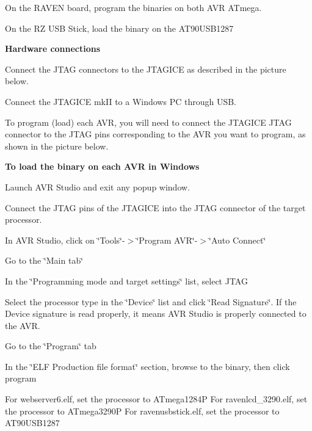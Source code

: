 \begin{DoxyItemize}
\item On the R\+A\+V\+EN board, program the binaries on both A\+VR A\+Tmega. \item On the RZ U\+SB Stick, load the binary on the A\+T90\+U\+S\+B1287\end{DoxyItemize}
{\bfseries Hardware connections}~\newline
 \begin{DoxyItemize}
\item Connect the J\+T\+AG connectors to the J\+T\+A\+G\+I\+CE as described in the picture below.\end{DoxyItemize}
 \begin{DoxyItemize}
\item Connect the J\+T\+A\+G\+I\+CE mk\+II to a Windows PC through U\+SB. \item To program (load) each A\+VR, you will need to connect the J\+T\+A\+G\+I\+CE J\+T\+AG connector to the J\+T\+AG pins corresponding to the A\+VR you want to program, as shown in the picture below.\end{DoxyItemize}


{\bfseries To load the binary on each A\+VR in Windows}~\newline


\begin{DoxyItemize}
\item Launch A\+VR Studio and exit any popup window. \item Connect the J\+T\+AG pins of the J\+T\+A\+G\+I\+CE into the J\+T\+AG connector of the target processor. \item In A\+VR Studio, click on \char`\"{}\+Tools\char`\"{}-\/$>$\char`\"{}\+Program A\+V\+R\char`\"{}-\/$>$\char`\"{}\+Auto Connect\char`\"{} \item Go to the \char`\"{}\+Main tab\char`\"{} \item In the \char`\"{}\+Programming mode and target settings\char`\"{} list, select J\+T\+AG \item Select the processor type in the \char`\"{}\+Device\char`\"{} list and click \char`\"{}\+Read Signature\char`\"{}. If the Device signature is read properly, it means A\+VR Studio is properly connected to the A\+VR. \item Go to the \char`\"{}\+Program\char`\"{} tab \item In the \char`\"{}\+E\+L\+F Production file format\char`\"{} section, browse to the binary, then click program\end{DoxyItemize}
\begin{DoxyVerb}For webserver6.elf, set the processor to ATmega1284P
For ravenlcd_3290.elf, set the processor to ATmega3290P
For ravenusbstick.elf, set the processor to AT90USB1287\end{DoxyVerb}


